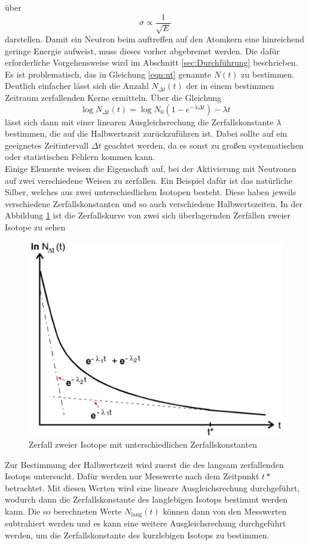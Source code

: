 über 
\begin{equation}
    \sigma \propto \frac{1}{\sqrt{E}}
\end{equation}
darstellen.
Damit ein Neutron beim auftreffen auf den Atomkern eine hinreichend geringe Energie aufweist, muss dieses vorher abgebremst werden.
Die dafür erforderliche Vorgehensweise wird im Abschnitt \ref{sec:Durchführung} beschrieben.
\\
Es ist problematisch, das in Gleichung \ref{eqn:nt} genannte $N(t)$ zu bestimmen. Deutlich einfacher lässt sich die Anzahl 
$N_{\Delta t}(t)$ der in einem bestimmen Zeitraum zerfallenden Kerne ermitteln. Über die Gleichung 
\begin{equation}
    \log{N_{\Delta t}(t)} = \log{N_0}(1 - e^{-\lambda\Delta t}) -\lambda t
    \label{eqn:N}
\end{equation}
lässt sich dann mit einer linearen Ausgleichsrechung die Zerfallskonstante $\lambda$ bestimmen, die auf die Halbwertszeit
zurückzuführen ist. Dabei sollte auf ein geeignetes Zeitintervall $\Delta t$ geachtet werden, da es sonst zu großen systematischen
oder statistischen Fehlern kommen kann. 
\\
Einige Elemente weisen die Eigenschaft auf, bei der Aktivierung mit Neutronen auf zwei verschiedene Weisen zu zerfallen. Ein 
Beispiel dafür ist das natürliche Silber, welches aus zwei unterschiedlichen Isotopen besteht. Diese haben jeweils verschiedene
Zerfallskonstanten und so auch verschiedene Halbwertszeiten. In der Abbildung \ref{fig:2iso} ist die Zerfallskurve von zwei
sich überlagernden Zerfällen zweier Isotope zu sehen 
\begin{figure}
    \centering
    \includegraphics[width=\textwidth]{data/zerfall.png}
    \caption{Zerfall zweier Isotope mit unterschiedlichen Zerfallskonstanten}
    \label{fig:2iso}
\end{figure}
Zur Bestimmung der Halbwertszeit wird zuerst die des langsam zerfallenden Isotops untersucht. Dafür werden nur Messwerte nach dem 
Zeitpunkt $t*$ betrachtet. Mit diesen Werten wird eine lineare Ausgleichsrechung durchgeführt, wodurch dann die Zerfallskonstante
des langlebigen Isotops bestimmt werden kann. Die so berechneten Werte $N_\text{lang}(t)$ können dann von den Messwerten 
subtrahiert werden und es kann eine weitere Ausgleichsrechung durchgeführt werden, um die Zerfallskonstante des kurzlebigen
Isotops zu bestimmen. 